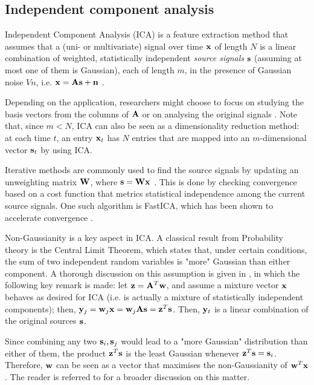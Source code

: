 \documentclass[../main.tex]{subfiles} \label{chapter_soa}
\begin{document}
\subsection{Independent component analysis} \label{subsection_ica}
Independent Component Analysis (ICA) is a feature extraction method that assumes that a (uni- or multivariate) signal over time $\mathbf{x}$ of length $N$ is a linear combination of weighted, statistically independent \emph{source signals} $\mathbf{s}$ (assuming at most one of them is Gaussian), each of length $m$, in the presence of Gaussian noise $V{n}$, i.e. $\mathbf{x} = \mathbf{As} + \mathbf{n}$ \cite{Kasprzak}.
\par Depending on the application, researchers might choose to focus on studying the basis vectors from the columns of $\mathbf{A}$ or on analysing the original signals \cite{Kasprzak,Hsieh2009,Chien2006,Jang2001}. Note that, since $m<N$, ICA can also be seen as a dimensionality reduction method: at each time $t$, an entry $\mathbf{x}_t$ has $N$ entries that are mapped into an $m$-dimensional vector $\mathbf{s}_t$ by using ICA. 
\par Iterative methods are commonly used to find the source signals by updating an unweighting matrix $\mathbf{W}$, where $\mathbf{s} = \mathbf{Wx}$ \cite{Hyvarinen2000}. This is done by checking convergence based on a cost function that metrics statistical independence among the current source signals. One such algorithm is FastICA, which has been shown to accelerate convergence \cite{Hyvarinen2000, Kasprzak}. 
\par Non-Gaussianity is a key aspect in ICA. A classical result from Probability theory is the Central Limit Theorem, which states that, under certain conditions, the sum of two independent random variables is "more" Gaussian than either component. A thorough discussion on this assumption is given in \cite{Hyvarinen2000}, in which the following key remark is made: let $\mathbf{z} = \mathbf{A}^T\mathbf{w}$, and assume a mixture vector $\mathbf{x}$ behaves as desired for ICA (i.e. is actually a mixture of statistically independent components); then, $\mathbf{y}_j = \mathbf{w}_j\mathbf{x} = \mathbf{w}_j\mathbf{As} = \mathbf{z}^T\mathbf{s}$. Then, $\mathbf{y}_t$ is a linear combination of the original sources $\mathbf{s}$. 
\par Since combining any two $\mathbf{s}_i, \mathbf{s}_j$ would lead to a "more Gaussian" distribution than either of them, the product $\mathbf{z}^T\mathbf{s}$ is the least Gaussian whenever $\mathbf{z}^T\mathbf{s} = \mathbf{s}_i$. Therefore, $\mathbf{w}$ can be seen as a vector that maximises the non-Gaussianity of $\mathbf{w}^T\mathbf{x}$. The reader is referred to \cite{Hyvarinen2000} for a broader discussion on this matter.
\end{document}
